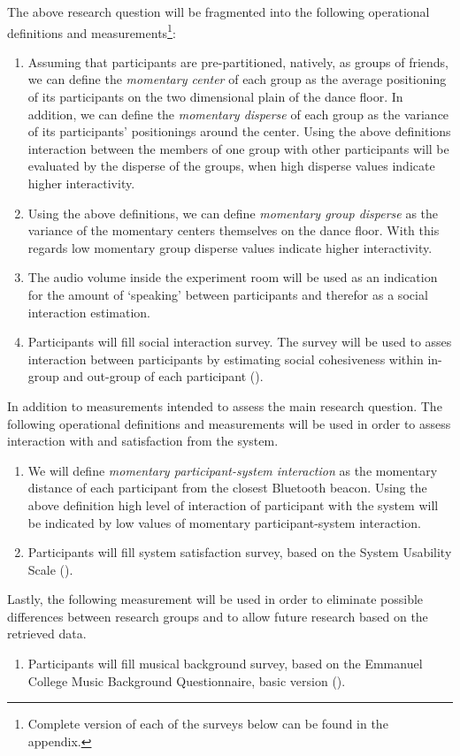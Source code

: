 \documentclass[a4paper,11pt]{article}
\newcommand{\definition}[1]{\emph{#1}}
\begin{document}
The above research question will be fragmented into the following operational definitions and measurements\footnote{Complete version of each of the surveys below can be found in the appendix.}:
\begin{enumerate}
	\item \label{measure:disperse} Assuming that participants are pre-partitioned, natively, as groups of friends, we can define the \definition{momentary center} of each group as the average positioning of its participants on the two dimensional plain of the dance floor.
	In addition, we can define the \definition{momentary disperse} of each group as the variance of its participants' positionings around the center.
	Using the above definitions interaction between the members of one group with other participants will be evaluated by the disperse of the groups, when high disperse values indicate higher interactivity.
	\item \label{measure:groups} Using the above definitions, we can define \definition{momentary group disperse} as the variance of the momentary centers themselves on the dance floor.
	With this regards low momentary group disperse values indicate higher interactivity.
	\item \label{measure:audio} The audio volume inside the experiment room will be used as an indication for the amount of `speaking' between participants and therefor as a social interaction estimation.
	\item \label{measure:survey:social} Participants will fill social interaction survey.
	The survey will be used to asses interaction between participants by estimating social cohesiveness within in-group and out-group of each participant ().
\end{enumerate}
In addition to measurements intended to assess the main research question.
The following operational definitions and measurements will be used in order to assess interaction with and satisfaction from the system.
\begin{enumerate}[resume]
	\item \label{measure:system} We will define \definition{momentary participant-system interaction} as the momentary distance of each participant from the closest Bluetooth beacon.
	Using the above definition high level of interaction of participant with the system will be indicated by low values of momentary participant-system interaction.
	\item \label{measure:survey:usability} Participants will fill system satisfaction survey, based on the System Usability Scale (\cite{brooke96}).
\end{enumerate}
Lastly, the following measurement will be used in order to eliminate possible differences between research groups and to allow future research based on the retrieved data.
\begin{enumerate}[resume]
	\item \label{measure:survey:musical} Participants will fill musical background survey, based on the Emmanuel College Music Background Questionnaire, basic version (\cite{web:zhao12}).
\end{enumerate}
\end{document}
